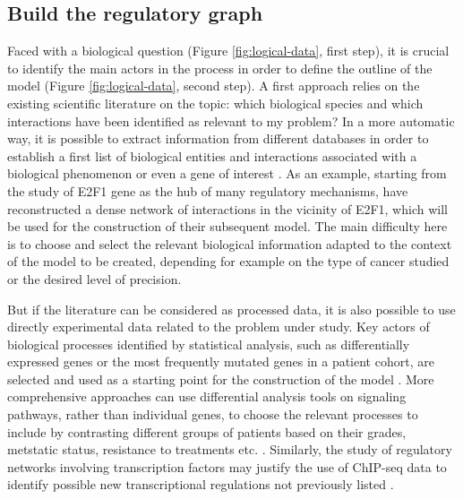 \documentclass[a4paper,12pt,twoside,onecolumn,openright,final,oldfontcommands]{memoir}
\begin{document}
\subsection{Build the regulatory
graph}\label{build-the-regulatory-graph}

Faced with a biological question (Figure \ref{fig:logical-data}, first
step), it is crucial to identify the main actors in the process in order
to define the outline of the model (Figure \ref{fig:logical-data},
second step). A first approach relies on the existing scientific
literature on the topic: which biological species and which interactions
have been identified as relevant to my problem? In a more automatic way,
it is possible to extract information from different databases in order
to establish a first list of biological entities and interactions
associated with a biological phenomenon or even a gene of interest
\citep[\citet{perfetto2016signor}]{kanehisa2012kegg}. As an example,
starting from the study of E2F1 gene as the hub of many regulatory
mechanisms, \citet{khan2017unraveling} have reconstructed a dense
network of interactions in the vicinity of E2F1, which will be used for
the construction of their subsequent model. The main difficulty here is
to choose and select the relevant biological information adapted to the
context of the model to be created, depending for example on the type of
cancer studied or the desired level of precision.

But if the literature can be considered as processed data, it is also
possible to use directly experimental data related to the problem under
study. Key actors of biological processes identified by statistical
analysis, such as differentially expressed genes or the most frequently
mutated genes in a patient cohort, are selected and used as a starting
point for the construction of the model \citep{remy2015modeling}. More
comprehensive approaches can use differential analysis tools on
signaling pathways, rather than individual genes, to choose the relevant
processes to include by contrasting different groups of patients based
on their grades, metstatic status, resistance to treatments etc.
\citep[\citet{montagud2017conceptual}]{martignetti2016roma}. Similarly,
the study of regulatory networks involving transcription factors may
justify the use of ChIP-seq data to identify possible new
transcriptional regulations not previously listed
\citep{collombet2017logical}.
\end{document}
